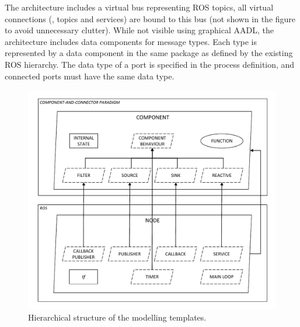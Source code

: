 The architecture includes a virtual bus representing ROS topics, all virtual connections (\ie, topics and services) are bound to this bus (not shown in the figure to avoid unnecessary clutter). While not visible using graphical AADL, the architecture includes data components for message types. Each type is represented by a data component in the same package as defined by the existing ROS hierarchy. The data type of a port is specified in the process definition, and connected ports must have the same data type.

\begin{figure}[t]
    \centering
    \includegraphics[width=\textwidth]{gfx/hierarchy}
    \caption{Hierarchical structure of the modelling templates.}\label{fig:template}
\end{figure}

